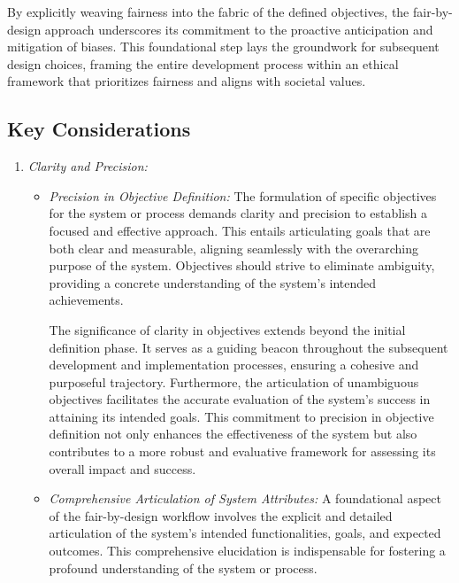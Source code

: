 \documentclass[12pt,a4paper,openright,twoside]{book}
\begin{document}
By explicitly weaving fairness into the fabric of the defined objectives, the fair-by-design approach underscores its commitment to the proactive anticipation and mitigation of biases. This foundational step lays the groundwork for subsequent design choices, framing the entire development process within an ethical framework that prioritizes fairness and aligns with societal values.

\subsection{Key Considerations}

\begin{enumerate}

    \item \emph{Clarity and Precision:}

        \begin{itemize}

            
            \item \emph{Precision in Objective Definition:} The formulation of specific objectives for the system or process demands clarity and precision to establish a focused and effective approach. This entails articulating goals that are both clear and measurable, aligning seamlessly with the overarching purpose of the system. Objectives should strive to eliminate ambiguity, providing a concrete understanding of the system's intended achievements. 
            
            The significance of clarity in objectives extends beyond the initial definition phase. It serves as a guiding beacon throughout the subsequent development and implementation processes, ensuring a cohesive and purposeful trajectory. Furthermore, the articulation of unambiguous objectives facilitates the accurate evaluation of the system's success in attaining its intended goals. This commitment to precision in objective definition not only enhances the effectiveness of the system but also contributes to a more robust and evaluative framework for assessing its overall impact and success.
            
            \item \emph{Comprehensive Articulation of System Attributes:} A foundational aspect of the fair-by-design workflow involves the explicit and detailed articulation of the system's intended functionalities, goals, and expected outcomes. This comprehensive elucidation is indispensable for fostering a profound understanding of the system or process.


\end{itemize}
\end{enumerate}
\end{document}

